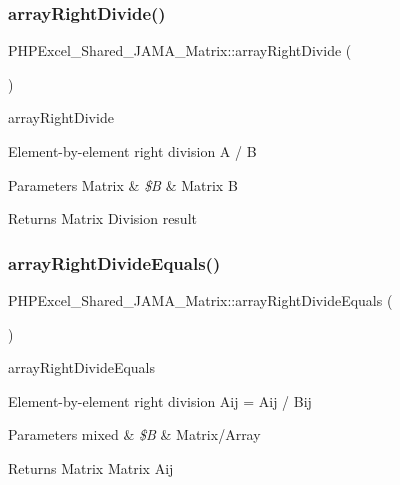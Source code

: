 \subsubsection{\texorpdfstring{array\+Right\+Divide()}{arrayRightDivide()}}
{\footnotesize\ttfamily P\+H\+P\+Excel\+\_\+\+Shared\+\_\+\+J\+A\+M\+A\+\_\+\+Matrix\+::array\+Right\+Divide (\begin{DoxyParamCaption}{ }\end{DoxyParamCaption})}

array\+Right\+Divide

Element-\/by-\/element right division A / B 
\begin{DoxyParams}[1]{Parameters}
Matrix & {\em \$B} & Matrix B \\
\hline
\end{DoxyParams}
\begin{DoxyReturn}{Returns}
Matrix Division result 
\end{DoxyReturn}
\mbox{\label{classPHPExcel__Shared__JAMA__Matrix_ac569fbbb456cf13a9a5a4c4c0ec8aa32}} 
\subsubsection{\texorpdfstring{array\+Right\+Divide\+Equals()}{arrayRightDivideEquals()}}
{\footnotesize\ttfamily P\+H\+P\+Excel\+\_\+\+Shared\+\_\+\+J\+A\+M\+A\+\_\+\+Matrix\+::array\+Right\+Divide\+Equals (\begin{DoxyParamCaption}{ }\end{DoxyParamCaption})}

array\+Right\+Divide\+Equals

Element-\/by-\/element right division Aij = Aij / Bij 
\begin{DoxyParams}[1]{Parameters}
mixed & {\em \$B} & Matrix/\+Array \\
\hline
\end{DoxyParams}
\begin{DoxyReturn}{Returns}
Matrix Matrix Aij 
\end{DoxyReturn}
\mbox{\label{classPHPExcel__Shared__JAMA__Matrix_aac2b8dd00cd0bace6b418b0ae69bd2f6}} 
